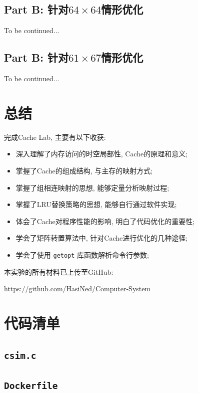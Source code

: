 \subsection[Part B: 针对64 x 64情形优化]{Part B: 针对$64 \times 64$情形优化}
To be continued...

\subsection[Part B: 针对61 x 67情形优化]{Part B: 针对$61 \times 67$情形优化}
To be continued...

\section{总结}

完成Cache Lab, 主要有以下收获:
\begin{itemize}
    \item 深入理解了内存访问的时空局部性, Cache的原理和意义;
    \item 掌握了Cache的组成结构, 与主存的映射方式;
    \item 掌握了组相连映射的思想, 能够定量分析映射过程;
    \item 掌握了LRU替换策略的思想, 能够自行通过软件实现;
    \item 体会了Cache对程序性能的影响, 明白了代码优化的重要性;
    \item 学会了矩阵转置算法中, 针对Cache进行优化的几种途径;
    \item 学会了使用 \verb|getopt| 库函数解析命令行参数;
\end{itemize}
本实验的所有材料已上传至GitHub:

\url{https://github.com/HasiNed/Computer-System}

\setupappendix

\clearpage
\section{代码清单}\label{codelist}

\subsection{\texttt{csim.c}}\label{csim-c}

\subsection{\texttt{Dockerfile}}\label{dockerfile}

